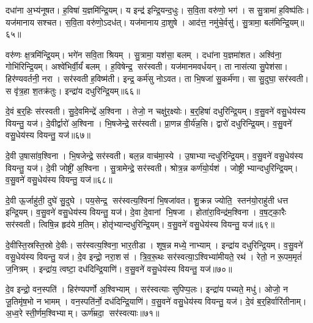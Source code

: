 दधा॑ना अ॒भ्य॑नूषत। ह॒विषा॑ य॒ज्ञमि॑न्द्रि॒यम्। य इन्द्र॑ इन्द्रि॒यन्द॒धुः। स॒वि॒ता वरु॑णो॒ भग॑। स सु॒त्रामा॑ ह॒विष्प॑तिः। यज॑मानाय सश्चत। स॒वि॒ता वरु॑णो॒ऽदध॑त्। यज॑मानाय दा॒शुषे। आद॑त्त॒ नमु॑चे॒र्वसु॑। सु॒त्रामा॒ बल॑मिन्द्रि॒यम्॥६५॥

वरु॑णः क्ष॒त्रमि॑न्द्रि॒यम्। भगे॑न सवि॒ता श्रियम्। सु॒त्रामा॒ यश॑सा॒ बलम्। दधा॑ना य॒ज्ञमा॑शत। अश्वि॑ना॒ गोभि॑रिन्द्रि॒यम्। अश्वे॑भिर्वी॒र्यं॑ बलम्। ह॒विषेन्द्र॒ सर॑स्वती। यज॑मानमवर्धयन्। ता नास॑त्या सु॒पेश॑सा। हिर॑ण्यवर्तनी॒ नरा। सर॑स्वती ह॒विष्म॑ती। इन्द्र॒ कर्म॑सु नोऽवत। ता भि॒षजा॑ सु॒कर्म॑णा। सा सु॒दुघा॒ सर॑स्वती। स वृ॑त्र॒हा श॒तक्र॑तुः। इन्द्रा॑य दधुरिन्द्रि॒यम्॥६६॥\anuvakamend[उ॒भा सर॑स्वती॒ बल॑मिन्द्रि॒यन्नरा॒ षट्च॑]

दे॒वं ब॒र्॒हिः स॑रस्वती। सु॒दे॒वमिन्द्रे॑ अ॒श्विना। तेजो॒ न चक्षु॑र॒क्ष्योः। ब॒र्॒हिषा॑ दधुरिन्द्रि॒यम्। व॒सु॒वने॑ वसु॒धेय॑स्य वियन्तु॒ यज॑। दे॒वीर्द्वारो॑ अ॒श्विना। भि॒षजेन्द्रे॒ सर॑स्वती। प्रा॒णन्न वी॒र्य॑न्न॒सि। द्वारो॑ दधुरिन्द्रि॒यम्। व॒सु॒वने॑ वसु॒धेय॑स्य वियन्तु॒ यज॑॥६७॥

दे॒वी उ॒षासा॑व॒श्विना। भि॒षजेन्द्रे॒ सर॑स्वती। बल॒न्न वाच॑मा॒स्ये। उ॒षाभ्यान्दधुरिन्द्रि॒यम्। व॒सु॒वने॑ वसु॒धेय॑स्य वियन्तु॒ यज॑। दे॒वी जोष्ट्री॑ अ॒श्विना। सु॒त्रामेन्द्रे॒ सर॑स्वती। श्रोत्र॒न्न कर्ण॑यो॒र्यश॑। जोष्ट्रीभ्यान्दधुरिन्द्रि॒यम्। व॒सु॒वने॑ वसु॒धेय॑स्य वियन्तु॒ यज॑॥६८॥

दे॒वी ऊ॒र्जाहु॑ती॒ दुघे॑ सु॒दुघे। पय॒सेन्द्र॒ सर॑स्वत्य॒श्विना॑ भि॒षजा॑वत। शु॒क्रन्न ज्योति॒ स्तन॑यो॒राहु॑ती धत्त इन्द्रि॒यम्। व॒सु॒वने॑ वसु॒धेय॑स्य वियन्तु॒ यज॑। दे॒वा दे॒वानां भि॒षजा। होता॑रा॒विन्द्र॑म॒श्विना। व॒ष॒ट्का॒रैः सर॑स्वती। त्विषि॒न्न हृद॑ये म॒तिम्। होतृ॑भ्यान्दधुरिन्द्रि॒यम्। व॒सु॒वने॑ वसु॒धेय॑स्य वियन्तु॒ यज॑॥६९॥

दे॒वीस्ति॒स्रस्ति॒स्रो दे॒वीः। सर॑स्वत्य॒श्विना॒ भार॒तीडा। शूष॒न्न मध्ये॒ नाभ्याम्। इन्द्रा॑य दधुरिन्द्रि॒यम्। व॒सु॒वने॑ वसु॒धेय॑स्य वियन्तु॒ यज॑। दे॒व इन्द्रो॒ नरा॒शस॑। त्रि॒व॒रू॒थः सर॑स्वत्या॒ऽश्विभ्या॑मीयते॒ रथ॑। रेतो॒ न रू॒पम॒मृतं॑ ज॒नित्रम्। इन्द्रा॑य॒ त्वष्टा॒ दध॑दिन्द्रि॒याणि॑। व॒सु॒वने॑ वसु॒धेय॑स्य वियन्तु॒ यज॑॥७०॥

दे॒व इन्द्रो॒ वन॒स्पति॑। हिर॑ण्यपर्णो अ॒श्विभ्याम्। सर॑स्वत्याः सुपिप्प॒लः। इन्द्रा॑य पच्यते॒ मधु॑। ओजो॒ न जू॒तिमृ॑ष॒भो न भामम्। वन॒स्पति॑र्नो॒ दध॑दिन्द्रि॒याणि॑। व॒सु॒वने॑ वसु॒धेय॑स्य वियन्तु॒ यज॑। दे॒वं ब॒र्॒हिर्वारि॑तीनाम्। अ॒ध्व॒रे स्ती॒र्णम॒श्विभ्याम्। ऊर्ण॑म्रदा॒ सर॑स्वत्याः॥७१॥

